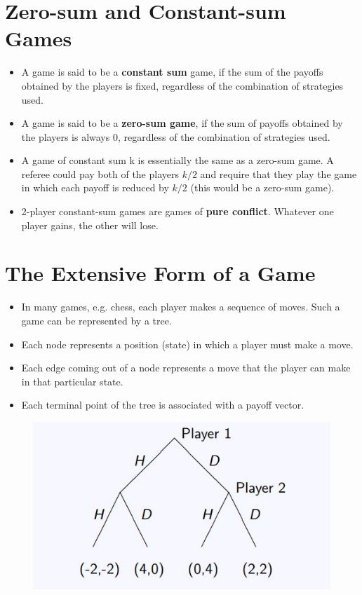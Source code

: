 \documentclass[]{report}
\begin{document}
\section{Zero-sum and Constant-sum Games}
\begin{itemize}
	\item A game is said to be a \textbf{constant sum} game, if the sum of the
	payoffs obtained by the players is fixed, regardless of the
	combination of strategies used.
	\item	A game is said to be a \textbf{zero-sum game}, if the sum of payoffs
	obtained by the players is always 0, regardless of the combination
	of strategies used.
	\item A game of constant sum k is essentially the same as a zero-sum
	game. A referee could pay both of the players $k/2$ and require that
	they play the game in which each payoff is reduced by $k/2$ (this
	would be a zero-sum game).
	\item	2-player constant-sum games are games of \textbf{pure conflict}.
	Whatever one player gains, the other will lose.
\end{itemize}

\section{The Extensive Form of a Game}
\begin{itemize}
	\item In many games, e.g. chess, each player makes a sequence of moves.
	Such a game can be represented by a tree. 
		\item  Each node represents a
	position (state) in which a player must make a move.
	\item 	Each edge coming out of a node represents a move that the player
	can make in that particular state.
	\item 	Each terminal point of the tree is associated with a payoff vector.
\end{itemize}




\begin{figure}[h!]
\centering
\includegraphics[width=0.55\linewidth]{images/DR5-Slide09}
\caption{}
\label{fig:DR5-Slide09}
\end{figure}
\end{document}
